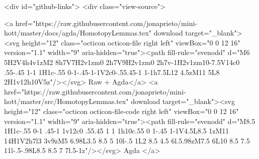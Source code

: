 {  <div id="github-links">
    <div class="view-source">
      
        <a href="https://raw.githubusercontent.com/jonaprieto/mini-hott/master/docs/agda/HomotopyLemmas.tex" download target="_blank"><svg height="12" class="octicon octicon-file right left" viewBox="0 0 12 16" version="1.1" width="9" aria-hidden="true"><path fill-rule="evenodd" d="M6 5H2V4h4v1zM2 8h7V7H2v1zm0 2h7V9H2v1zm0 2h7v-1H2v1zm10-7.5V14c0 .55-.45 1-1 1H1c-.55 0-1-.45-1-1V2c0-.55.45-1 1-1h7.5L12 4.5zM11 5L8 2H1v12h10V5z"/></svg> Raw + Agda</a>
        <a href="https://raw.githubusercontent.com/jonaprieto/mini-hott/master/src/HomotopyLemmas.tex" download target="_blank"><svg height="12" class="octicon octicon-file-code right left" viewBox="0 0 12 16" version="1.1" width="9" aria-hidden="true"><path fill-rule="evenodd" d="M8.5 1H1c-.55 0-1 .45-1 1v12c0 .55.45 1 1 1h10c.55 0 1-.45 1-1V4.5L8.5 1zM11 14H1V2h7l3 3v9zM5 6.98L3.5 8.5 5 10l-.5 1L2 8.5 4.5 6l.5.98zM7.5 6L10 8.5 7.5 11l-.5-.98L8.5 8.5 7 7l.5-1z"/></svg> Agda </a>
      
}
